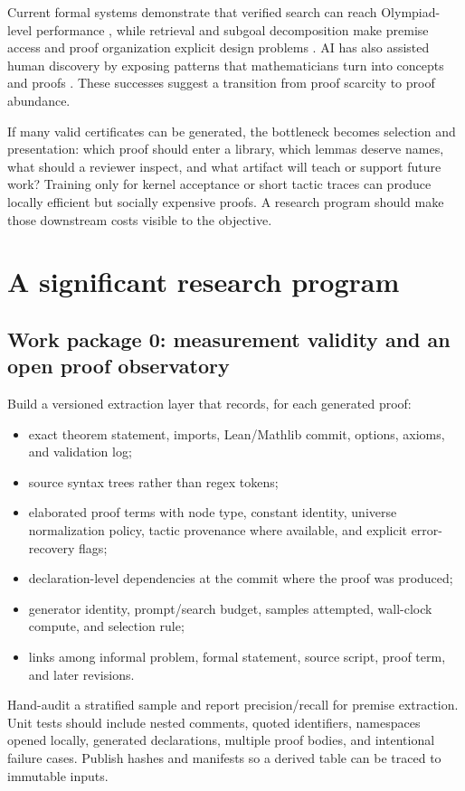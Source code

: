\documentclass[11pt]{article}
\begin{document}
Current formal systems demonstrate that verified search can reach Olympiad-level performance
\citep{trinh2024,hubert2026}, while retrieval and subgoal decomposition make premise access and
proof organization explicit design problems \citep{yang2023,ren2025}.  AI has also assisted human
discovery by exposing patterns that mathematicians turn into concepts and proofs
\citep{davies2021}.  These successes suggest a transition from proof scarcity to proof abundance.

If many valid certificates can be generated, the bottleneck becomes selection and presentation:
which proof should enter a library, which lemmas deserve names, what should a reviewer inspect, and
what artifact will teach or support future work?  Training only for kernel acceptance or short
tactic traces can produce locally efficient but socially expensive proofs.  A research program
should make those downstream costs visible to the objective.

\section{A significant research program}

\subsection{Work package 0: measurement validity and an open proof observatory}

Build a versioned extraction layer that records, for each generated proof:
\begin{itemize}[leftmargin=*]
  \item exact theorem statement, imports, Lean/Mathlib commit, options, axioms, and validation log;
  \item source syntax trees rather than regex tokens;
  \item elaborated proof terms with node type, constant identity, universe normalization policy,
        tactic provenance where available, and explicit error-recovery flags;
  \item declaration-level dependencies at the commit where the proof was produced;
  \item generator identity, prompt/search budget, samples attempted, wall-clock compute, and selection rule;
  \item links among informal problem, formal statement, source script, proof term, and later revisions.
\end{itemize}
Hand-audit a stratified sample and report precision/recall for premise extraction.  Unit tests should
include nested comments, quoted identifiers, namespaces opened locally, generated declarations,
multiple proof bodies, and intentional failure cases.  Publish hashes and manifests so a derived
table can be traced to immutable inputs.
\end{document}
